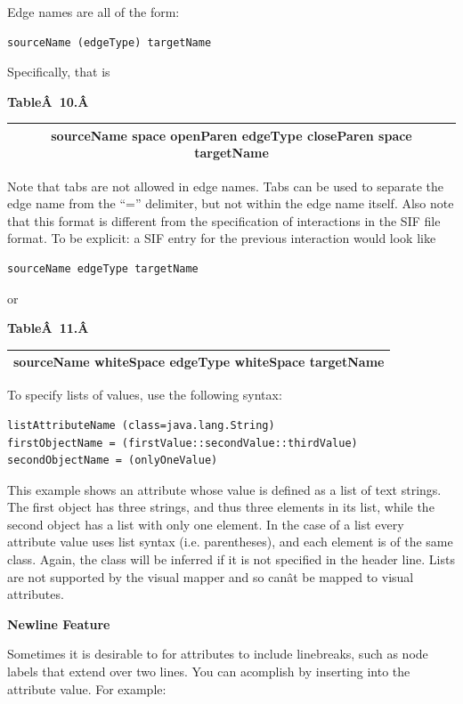 Edge names are all of the form: 

 \begin{verbatim}
sourceName (edgeType) targetName
\end{verbatim}

 Specifically, that is 

 \textbf{Table\^A 10.\^A }

\begin{tabular}{|c|}
 \hline 
 sourceName space openParen edgeType closeParen space targetName \\
 \hline 
\end{tabular}

 Note that tabs are not allowed in edge names. Tabs can be used to separate the
edge name from the ``='' delimiter, but not within the edge name itself. Also
note that this format is different from the specification of interactions in
the SIF file format. To be explicit: a SIF entry for the previous interaction
would look like 

 \begin{verbatim}
sourceName edgeType targetName
\end{verbatim}

 or 

 \textbf{Table\^A 11.\^A }
\begin{tabular}{|c|}
\hline 
 sourceName whiteSpace edgeType whiteSpace targetName \\
\hline 
\end{tabular}

 To specify lists of values, use the following syntax: 

 \begin{verbatim}
listAttributeName (class=java.lang.String)
firstObjectName = (firstValue::secondValue::thirdValue)
secondObjectName = (onlyOneValue)
\end{verbatim}

 This example shows an attribute whose value is defined as a list of text
strings. The first object has three strings, and thus three elements in its
list, while the second object has a list with only one element. In the case of
a list every attribute value uses list syntax (i.e. parentheses), and each
element is of the same class. Again, the class will be inferred if it is not
specified in the header line. Lists are not supported by the visual mapper and
so can\^at be mapped to visual attributes. 

\textbf{Newline Feature}

Sometimes it is desirable to for attributes to include linebreaks, such as node
labels that extend over two lines. You can acomplish by inserting   into the
attribute value. For example: 


